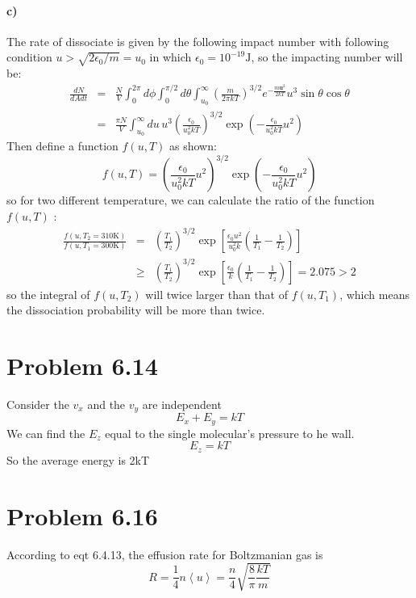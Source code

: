 \documentclass{article}
\begin{document}
\paragraph{c)}
The rate of dissociate is given by the following impact number with following condition $u> \sqrt{2\epsilon_0/m} = u_0$ in which $\epsilon_0 = 10^{-19}\mathrm{J}$, so the impacting number will be:
\begin{eqnarray}
\frac{dN}{dAdt} &=& \frac{N}{V}\int_0^{2\pi}d\phi \int_0^{\pi/2}d\theta \int_{u_0}^\infty \left(\frac{m}{2\pi kT}\right)^{3/2}e^{-\frac{m\mathbf{u}^2}{2kT}}u^3\sin{\theta} \cos{\theta}\nonumber\\
&=&\frac{\pi N}{V}\int_{u_0}^\infty du\,u^3\left(\frac{\epsilon_0}{u_0^2 kT}\right)^{3/2}\exp{\left(-\frac{\epsilon_0}{u_0^2 kT}u^2\right)}
\end{eqnarray}
Then define a function $f(u,T)$ as shown:
$$
f(u,T) = \left(\frac{\epsilon_0}{u_0^2 kT}u^2\right)^{3/2}\exp{\left(-\frac{\epsilon_0}{u_0^2 kT}u^2\right)}
$$
so for two different temperature, we can calculate the ratio of the function $f(u,T)$ :
\begin{eqnarray}
\frac{f(u,T_2 = 310\mathrm{K})}{f(u,T_1 = 300\mathrm{K})}& =& \left(\frac{T_1}{T_2}\right)^{3/2}\exp\left[\frac{\epsilon_0 u^2}{u_0^2k}\left(\frac{1}{T_1}-\frac{1}{T_2}\right)\right]\nonumber\\
&\geq&\left(\frac{T_1}{T_2}\right)^{3/2}\exp\left[\frac{\epsilon_0}{k}\left(\frac{1}{T_1}-\frac{1}{T_2}\right)\right]=2.075> 2
\end{eqnarray}
so the integral of $f(u,T_2)$ will twice larger than that of $f(u,T_1)$, which means the dissociation probability will be more than twice.


\section*{Problem 6.14}
Consider the $v_x$ and the $v_y$ are independent 
$$E_x+E_y=kT$$
We can find the $E_z$ equal to the single molecular's pressure to he wall.
$$E_z=kT$$ 
So the average energy is 2kT


\section*{Problem 6.16} %
\label{sec:problem_6_16}
	According to eqt 6.4.13, the effusion rate for Boltzmanian gas is
	\begin{equation}
		R=\frac{1}{4}n\left< u \right>= \frac{n}{4}\sqrt{\frac{8}{\pi} \frac{kT}{m}}
	\end{equation}
\end{document}
